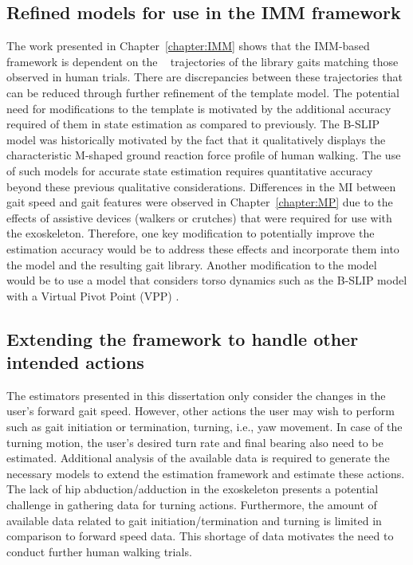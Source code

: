 \subsection{Refined models for use in the IMM framework}
The work presented in Chapter~\ref{chapter:IMM} shows that the IMM-based framework is dependent on the \com~ trajectories of the library gaits matching those observed in human trials. There are discrepancies between these trajectories that can be reduced through further refinement of the template model. The potential need for modifications to the template is motivated by the additional accuracy required of them in state estimation as compared to previously. The B-SLIP model was historically motivated by the fact that it qualitatively displays the characteristic M-shaped ground reaction force profile of human walking. The use of such models for accurate state estimation requires quantitative accuracy beyond these previous qualitative considerations. Differences in the MI between gait speed and gait features were observed in Chapter~\ref{chapter:MP} due to the effects of assistive devices (walkers or crutches) that were required for use with the exoskeleton. Therefore, one key modification to potentially improve the estimation accuracy would be to address these effects and incorporate them into the model and the resulting gait library. Another modification to the model would be to use a model that considers torso dynamics such as the B-SLIP model with a Virtual Pivot Point (VPP) \cite{maus2010upright}.

\subsection{Extending the framework to handle other intended actions}

The estimators presented in this dissertation only consider the changes in the user's forward gait speed. However, other actions the user may wish to perform such as gait initiation or termination, turning, i.e., yaw movement. In case of the turning motion, the user's desired turn rate and final bearing also need to be estimated. Additional analysis of the available data is required to generate the necessary models to extend the estimation framework and estimate these actions. The lack of hip abduction/adduction in the exoskeleton presents a potential challenge in gathering data for turning actions. Furthermore, the amount of available data related to gait initiation/termination and turning is limited in comparison to forward speed data. This shortage of data motivates the need to conduct further human walking trials.

